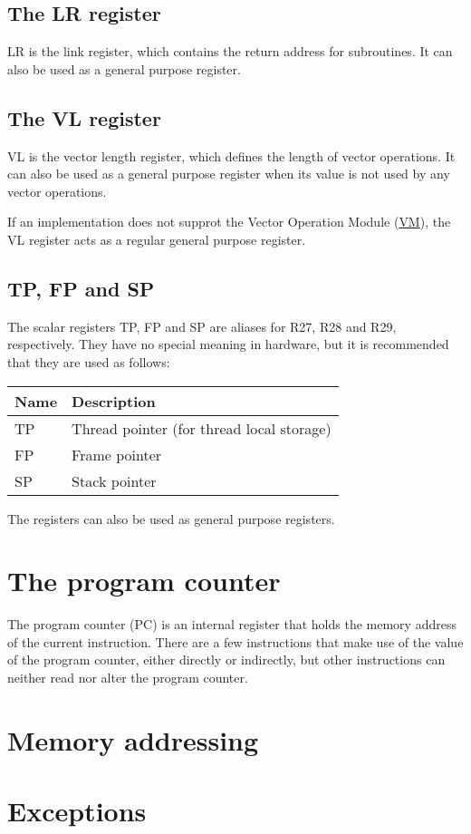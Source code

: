 \subsection{The LR register}

LR is the link register, which contains the return address for subroutines. It
can also be used as a general purpose register.

\subsection{The VL register}

VL is the vector length register, which defines the length of vector
operations. It can also be used as a general purpose register when its value
is not used by any vector operations.

If an implementation does not supprot the Vector Operation Module
(\hyperref[module:VM]{VM}), the VL register acts as a regular general purpose
register.

\subsection{TP, FP and SP}

The scalar registers TP, FP and SP are aliases for R27, R28 and R29,
respectively. They have no special meaning in hardware, but it is recommended
that they are used as follows:

\begin{tabular}{|l|l|}
  \hline
  \textbf{Name} & \textbf{Description} \\
  \hline
  TP & Thread pointer (for thread local storage) \\
  \hline
  FP & Frame pointer \\
  \hline
  SP & Stack pointer \\
  \hline
\end{tabular}

The registers can also be used as general purpose registers.

\section{The program counter}

The program counter (PC) is an internal register that holds the memory address
of the current instruction. There are a few instructions that make use of the
value of the program counter, either directly or indirectly, but other
instructions can neither read nor alter the program counter.

\section{Memory addressing}

\tbd

\section{Exceptions}

\tbd
